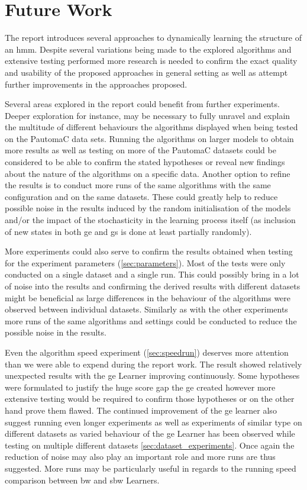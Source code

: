 \chapter{Future Work}
\label{chap:future_work}
The report introduces several approaches to dynamically learning the structure of an \gls{hmm}. Despite several variations being made to the explored algorithms and extensive testing performed more research is needed to confirm the exact quality and usability of the proposed approaches in general setting as well as attempt further improvements in the approaches proposed.

Several areas explored in the report could benefit from further experiments. Deeper exploration for instance, may be necessary to fully unravel and explain the multitude of different behaviours the algorithms displayed when being tested on the PautomaC data sets. Running the algorithms on larger models to obtain more results as well as testing on more of the PautomaC datasets could be considered to be able to confirm the stated hypotheses or reveal new findings about the nature of the algorithms on a specific data. Another option to refine the results is to conduct more runs of the same algorithms with the same configuration and on the same datasets. These could greatly help to reduce possible noise in the results induced by the random initialisation of the models and/or the impact of the stochasticity in the learning process itself (as inclusion of new states in both \acrlong{ge} and \acrlong{gs} is done at least partially randomly).

More experiments could also serve to confirm the results obtained when testing for the experiment parameters (\ref{sec:parameters}). Most of the tests were only conducted on a single dataset and a single run. This could possibly bring in a lot of noise into the results and confirming the derived results with different datasets might be beneficial as large differences in the behaviour of the algorithms were observed between individual datasets. Similarly as with the other experiments more runs of the same algorithms and settings could be conducted to reduce the possible noise in the results.

Even the algorithm speed experiment (\ref{sec:speedrun}) deserves more attention than we were able to expend during the report work. The result showed relatively unexpected results with the \gls{ge} Learner improving continuously. Some hypotheses were formulated to justify the huge score gap the \gls{ge} created however more extensive testing would be required to confirm those hypotheses or on the other hand prove them flawed. The continued improvement of the \gls{ge} learner also suggest running even longer experiments as well as experiments of similar type on different datasets as varied behaviour of the \gls{ge} Learner has been observed while testing on multiple different datasets \ref{sec:dataset_experiments}. Once again the reduction of noise may also play an important role and more runs are thus suggested. More runs may be particularly useful in regards to the running speed comparison between \acrlong{bw} and \acrlong{sbw} Learners.

